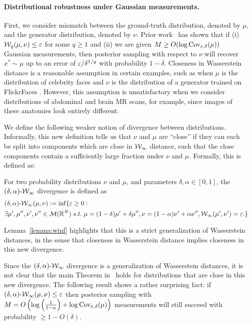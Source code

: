\paragraph{Distributional robustness under Gaussian measurements.}
First, we consider mismatch between the ground-truth distribution, denoted by $\mu$, and the generator distribution, denoted by $\nu$. Prior work~\cite{jalal2021instance} has shown that if (i) $\mathcal W_q(\mu, \nu) \leq \varepsilon$ for some $q\geq 1$ and (ii) we are given $M \geq O(\log \operatorname{Cov}_{\varepsilon, \delta} (\mu))$ Gaussian measurements, then posterior sampling with respect to $\nu$ will recover $x^* \sim \mu$ up to an error of $\varepsilon / \delta^{1/q}$ with probability $1-\delta$. Closeness in Wasserstein distance is a reasonable assumption in certain examples, such as when $\mu$ is the distribution of celebrity faces and $\nu$ is the distribution of a generator trained on FlickrFaces \cite{karras2019style}. However, this assumption is unsatisfactory when we consider distributions of abdominal and brain MR scans, for example, since images of these anatomies look entirely different.  

We define the following weaker notion of divergence between distributions. Informally, this new definition tells us that $\nu$ and $\mu$ are ``close'' if they can each be split into components which are close in $\mathcal W_\infty$ distance, such that the close components contain a sufficiently large fraction under $\nu$ and $\mu$. Formally, this is defined as:
\begin{definition}
  For two probability distributions $\nu$ and $\mu$, and parameters
  $\delta, \alpha \in [0,1]$, the $(\delta, \alpha)\text{-}\mathcal W_\infty$
  divergence is defined as
  \begin{align*}
    &(\delta, \alpha)\text{-}\mathcal W_\infty(\mu, \nu) := \inf \{ \varepsilon \geq 0: \\ 
    & \exists \mu', \mu'', \nu', \nu'' \in \mathcal M(\mathbb{R}^N) \; s.t.\; \mu = (1-\delta)
  \mu' + \delta \mu'', \nu = (1 - \alpha) \nu' + \alpha \nu'', \mathcal W_\infty(\mu',
\nu') = \varepsilon. \}
  \end{align*}
\end{definition}
Lemma~\ref{lemma:winf} highlights that this is a strict generalization of Wasserstein distances, in the sense that closeness in Wasserstein distance implies closeness in this new divergence.

Since the $(\delta,\alpha)\text{-}\mathcal W_\infty$ divergence is a
generalization of Wasserstein distances, it is not clear that the main
Theorem in~\cite{jalal2021instance} holds for distributions that are close in
this new divergence.  The following result shows a rather
surprising fact: if $(\delta,\alpha)\text{-}\mathcal W_\infty(\mu , \nu) \leq \varepsilon$
then posterior sampling with $M =O \left( \log \left( \frac{1}{1 -
\alpha} \right) + \log \operatorname{Cov}_{\varepsilon,\delta} (\mu) \right) $
measurements will still succeed with probability $\geq 1-O(\delta)$.  


